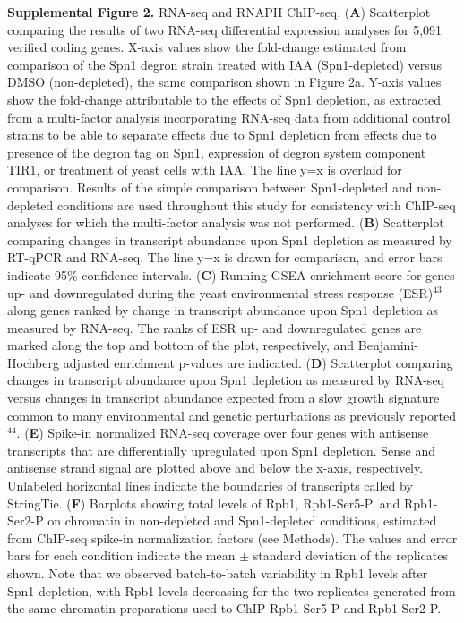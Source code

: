 \documentclass[8pt]{extarticle}
\begin{document}
\vspace{2em}
\textbf{Supplemental Figure 2.} RNA-seq and RNAPII ChIP-seq.
(\textbf{A}) Scatterplot comparing the results of two RNA-seq differential expression analyses for 5,091 verified coding genes.
X-axis values show the fold-change estimated from comparison of the Spn1 degron strain treated with IAA (Spn1-depleted) versus DMSO (non-depleted), the same comparison shown in Figure 2a.
Y-axis values show the fold-change attributable to the effects of Spn1 depletion, as extracted from a multi-factor analysis incorporating RNA-seq data from additional control strains to be able to separate effects due to Spn1 depletion from effects due to presence of the degron tag on Spn1, expression of degron system component TIR1, or treatment of yeast cells with IAA.
The line y=x is overlaid for comparison.
Results of the simple comparison between Spn1-depleted and non-depleted conditions are used throughout this study for consistency with ChIP-seq analyses for which the multi-factor analysis was not performed.
(\textbf{B}) Scatterplot comparing changes in transcript abundance upon Spn1 depletion as measured by RT-qPCR and RNA-seq. The line y=x is drawn for comparison, and error bars indicate 95\% confidence intervals.
(\textbf{C}) Running GSEA enrichment score for genes up- and downregulated during the yeast environmental stress response (ESR)$^{43}$ along genes ranked by change in transcript abundance upon Spn1 depletion as measured by RNA-seq.
The ranks of ESR up- and downregulated genes are marked along the top and bottom of the plot, respectively, and Benjamini-Hochberg adjusted enrichment p-values are indicated.
(\textbf{D}) Scatterplot comparing changes in transcript abundance upon Spn1 depletion as measured by RNA-seq versus changes in transcript abundance expected from a slow growth signature common to many environmental and genetic perturbations as previously reported$^{44}$.
(\textbf{E}) Spike-in normalized RNA-seq coverage over four genes with antisense transcripts that are differentially upregulated upon Spn1 depletion.
Sense and antisense strand signal are plotted above and below the x-axis, respectively.
Unlabeled horizontal lines indicate the boundaries of transcripts called by StringTie.
(\textbf{F}) Barplots showing total levels of Rpb1, Rpb1-Ser5-P, and Rpb1-Ser2-P on chromatin in non-depleted and Spn1-depleted conditions, estimated from ChIP-seq spike-in normalization factors (see Methods).
The values and error bars for each condition indicate the mean $\pm$ standard deviation of the replicates shown.
Note that we observed batch-to-batch variability in Rpb1 levels after Spn1 depletion, with Rpb1 levels decreasing for the two replicates generated from the same chromatin preparations used to ChIP Rpb1-Ser5-P and Rpb1-Ser2-P.
\end{document}
